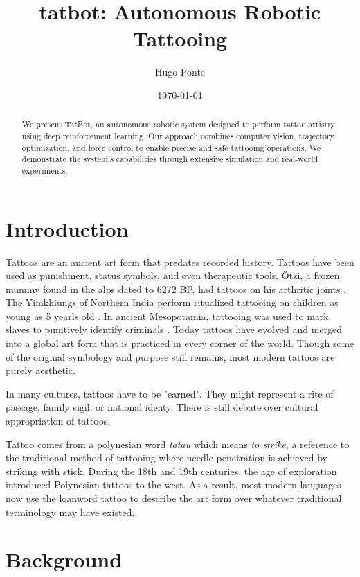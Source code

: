 \documentclass[11pt]{article}
\title{tatbot: Autonomous Robotic Tattooing}
\author{Hugo Ponte}
\date{\today}
\begin{document}
\maketitle

\begin{abstract}
We present TatBot, an autonomous robotic system designed to perform tattoo artistry using deep reinforcement learning. Our approach combines computer vision, trajectory optimization, and force control to enable precise and safe tattooing operations. We demonstrate the system's capabilities through extensive simulation and real-world experiments.
\end{abstract}

\section{Introduction}

Tattoos are an ancient art form that predates recorded history.
Tattoos have been used as punishment, status symbols, and even therapeutic tools.
Ötzi, a frozen mummy found in the alps dated to 6272 BP, had tattoos on his arthritic joints \cite{deterwolf_worlds_oldest}.
The Yimkhiungs of Northern India perform ritualized tattooing on children as young as 5 yearls old \cite{kluger2015cultural}.
In ancient Mesopotamia, tattooing was used to mark slaves to punitively identify criminals \cite{hawken2022tattooing}.
Today tattoos have evolved and merged into a global art form that is practiced in every corner of the world.
Though some of the original symbology and purpose still remains, most modern tattoos are purely aesthetic.

In many cultures, tattoos have to be "earned". They might represent a rite of passage, family sigil, or national identy. There is still debate over cultural appropriation of tattoos.

Tattoo comes from a polynesian word \textit{tatau} which means \textit{to strike}, a reference to the traditional method of tattooing where needle penetration is achieved by striking with stick.
During the 18th and 19th centuries, the age of exploration introduced Polynesian tattoos to the west.
As a result, most modern languages now use the loanword tattoo to describe the art form over whatever traditional terminology may have existed.

\section{Background}
\end{document}
